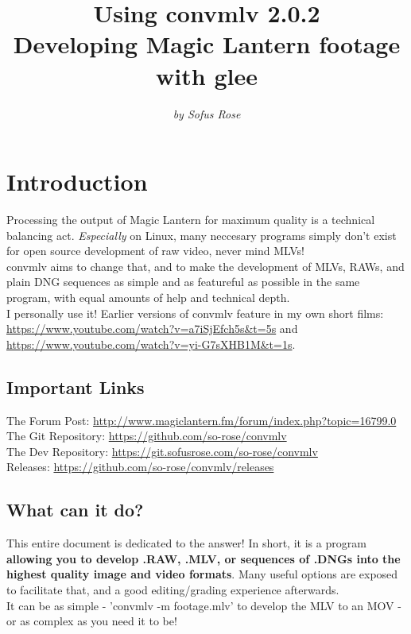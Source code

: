 \documentclass[a4paper,12pt]{article}
\author{\textit{by Sofus Rose}}
\title{\textbf{Using convmlv 2.0.2} \\ {\large Developing Magic Lantern footage with glee}}
\begin{document}
\maketitle{}
\tableofcontents{}
\newpage

\section{Introduction}
	Processing the output of Magic Lantern for maximum quality is a technical balancing act. \textit{Especially} on Linux, many
	neccesary programs simply don't exist for open source development of raw video, never mind MLVs!\\
	
	convmlv aims to change that, and to make the development of MLVs, RAWs, and plain DNG sequences as simple and as featureful as
	possible in the same program, with equal amounts of help and technical depth.\\
	
	I personally use it! Earlier versions of convmlv feature in my own short films:
	\url{https://www.youtube.com/watch?v=a7iSjEfch5s&t=5s} and \url{https://www.youtube.com/watch?v=yi-G7sXHB1M&t=1s}.
	
	\subsection{Important Links}
		The Forum Post: \url{http://www.magiclantern.fm/forum/index.php?topic=16799.0}\\
		The Git Repository: \url{https://github.com/so-rose/convmlv}\\
		The Dev Repository: \url{https://git.sofusrose.com/so-rose/convmlv}\\
		Releases: \url{https://github.com/so-rose/convmlv/releases}\\
	
	\subsection{What can it do?}
		This entire document is dedicated to the answer! In short, it is a program \textbf{allowing you to develop .RAW, .MLV, or sequences of .DNGs
		into the highest quality image and video formats}. Many useful options are exposed to facilitate that, and a good editing/grading experience afterwards.\\
		
		It can be as simple - 'convmlv -m footage.mlv' to develop the MLV to an MOV - or as complex as you need it to be!
\end{document}

